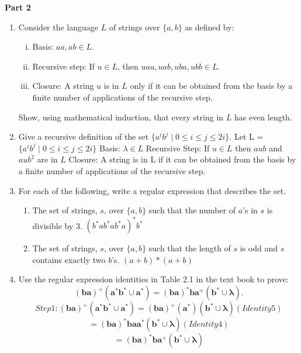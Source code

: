 \begin{center}
    \textbf{Part 2}
\end{center}

\begin{enumerate}

\item Consider the language $L$ of strings over $\{a, b\}$ as defined
  by:
\begin{enumerate}[i)]
\item Basis: $aa, ab \in L$.
\item Recursive step: If $u \in L$, then $uaa, uab, uba, ubb \in L$.
\item Closure: A string $u$ is in $L$ only if it can be obtained from
  the basis by a finite number of applications of the recursive step.
\end{enumerate}
Show, using mathematical induction, that every string in $L$ has even
length.

\item Give a recursive definition of the set $\{ a^ib^j \mid 0 \leq i
  \leq j \leq 2i \}$.
  \newline Let L = $\{ a^ib^j \mid 0 \leq i \leq j \leq 2i \}$
  \newline Basis: $\lambda \in L$ 
  \newline Recursive Step: If $u \in L$ then $aub$ and $aub^2$ are in $L$
  \newline Closure: A string is in L if it can be obtained from the basis by a finite number of applications of the recursive step.

  \item For each of the following, write a
  regular expression that describes the set.
\begin{enumerate}
\item The set of strings, $s$, over $\{a, b\}$ such that the number of
  $a$'s in $s$
  is divisible by 3.
  \newline $(b^*ab^*ab^*a)^*b^*$

\item The set of strings, $s$, over $\{a, b\}$ such that the length of
  $s$ is odd and $s$
  contains exactly two $b$'s.
  \newline $(a+b)*(a+b)$

\end{enumerate}

\item Use the regular expression identities in Table 2.1 in the text
  book to prove:
\[
  \mathbf{(ba)^+(a^*b^* \cup a^*)} = \mathbf{(ba)^*ba^+(b^* \cup \lambda)}. 
\]
\[
  Step 1: \mathbf{(ba)^+(a^*b^* \cup a^*)} = \mathbf{(ba)^+(a^*)(b^* \cup \lambda)} (Identity 5)
\]
\[
  = \mathbf{(ba)^*baa^*(b^* \cup \lambda)} (Identity 4)
\]
\[
  = \mathbf{(ba)^*ba^+(b^* \cup \lambda)}
\]
 
\end{enumerate}



